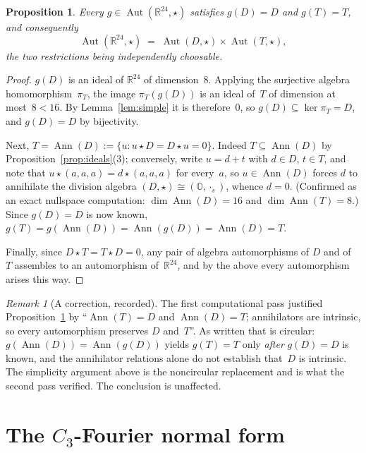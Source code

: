 \documentclass[11pt]{amsart}
\newcommand{\OO}{\mathbb{O}}
\newcommand{\RR}{\mathbb{R}}
\DeclareMathOperator{\Aut}{Aut}
\DeclareMathOperator{\Ann}{Ann}
\newtheorem{proposition}[theorem]{Proposition}
\theoremstyle{definition}
\theoremstyle{remark}
\newtheorem{remark}[theorem]{Remark}
\begin{document}
\begin{proposition}\label{prop:preserve}
Every $g \in \Aut(\RR^{24}, \star)$ satisfies $g(D) = D$ and $g(T) = T$, and
consequently
\[
  \Aut(\RR^{24}, \star) \;=\; \Aut(D, \star) \times \Aut(T, \star),
\]
the two restrictions being independently choosable.
\end{proposition}

\begin{proof}
$g(D)$ is an ideal of $\RR^{24}$ of dimension~$8$. Applying the surjective
algebra homomorphism~$\pi_T$, the image $\pi_T(g(D))$ is an ideal of~$T$ of
dimension at most~$8 < 16$. By Lemma~\ref{lem:simple} it is therefore~$0$,
so $g(D) \subseteq \ker \pi_T = D$, and $g(D) = D$ by bijectivity.

Next, $T = \Ann(D) := \{u : u \star D = D \star u = 0\}$. Indeed
$T \subseteq \Ann(D)$ by Proposition~\ref{prop:ideals}(3); conversely, write
$u = d + t$ with $d \in D$, $t \in T$, and note that
$u \star (a,a,a) = d \star (a,a,a)$ for every~$a$, so $u \in \Ann(D)$ forces
$d$ to annihilate the division algebra $(D,\star) \cong (\OO, \cdot_s)$,
whence $d = 0$. (Confirmed as an exact nullspace computation:
$\dim \Ann(D) = 16$ and $\dim \Ann(T) = 8$.) Since $g(D) = D$ is now known,
$g(T) = g(\Ann(D)) = \Ann(g(D)) = \Ann(D) = T$.

Finally, since $D \star T = T \star D = 0$, any pair of algebra automorphisms
of $D$ and of~$T$ assembles to an automorphism of~$\RR^{24}$, and by the
above every automorphism arises this way.
\end{proof}

\begin{remark}[A correction, recorded]\label{rem:circular}
The first computational pass justified Proposition~\ref{prop:preserve} by
``$\Ann(T) = D$ and $\Ann(D) = T$; annihilators are intrinsic, so every
automorphism preserves $D$ and~$T$''. As written that is circular:
$g(\Ann(D)) = \Ann(g(D))$ yields $g(T) = T$ only \emph{after} $g(D) = D$ is
known, and the annihilator relations alone do not establish that~$D$ is
intrinsic. The simplicity argument above is the noncircular replacement and
is what the second pass verified. The conclusion is unaffected.
\end{remark}

\section{The $C_3$-Fourier normal form}\label{sec:fourier}
\end{document}
